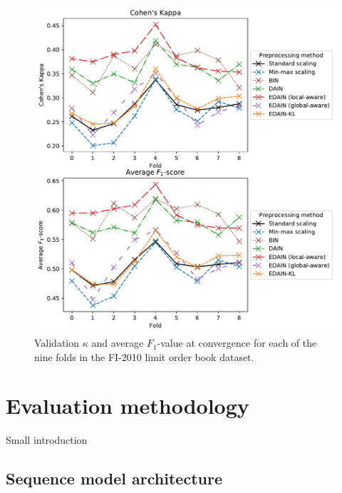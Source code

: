 \documentclass{statsmsc}
\begin{document}
{%
\begin{figure}[htp]
\begin{center}
    \includegraphics[width=\textwidth]{figures/lob_performance_per_fold.pdf}
\end{center}
\caption{Validation $\kappa$ and average $F_1$-value at convergence for each of the
    nine folds in the FI-2010 limit order book dataset.}
\label{fig:lob_folds}
\end{figure}


\clearpage

\section{Evaluation methodology}%
\label{sec:Evaluation methodology}%

Small introduction

\subsection{Sequence model architecture}%
\label{sub:Sequence model architecture}

}
\end{document}
